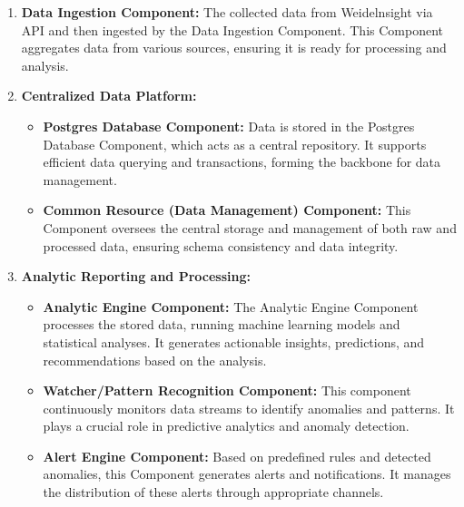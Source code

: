 \documentclass[11pt]{article}
\begin{document}
\begin{enumerate}[label=\arabic*., wide=0pt, left=0pt]

    \item \textbf{Data Ingestion Component:} The collected data from Weidelnsight via API and then ingested by the Data Ingestion Component. This Component aggregates data from various sources, ensuring it is ready for processing and analysis.

    \item \textbf{Centralized Data Platform:}
    \begin{itemize}
        \item \textbf{Postgres Database Component:} Data is stored in the Postgres Database Component, which acts as a central repository. It supports efficient data querying and transactions, forming the backbone for data management.
        \item \textbf{Common Resource (Data Management) Component:} This Component oversees the central storage and management of both raw and processed data, ensuring schema consistency and data integrity.
    \end{itemize}

    \item \textbf{Analytic Reporting and Processing:}
    \begin{itemize}
        \item \textbf{Analytic Engine Component:} The Analytic Engine Component processes the stored data, running machine learning models and statistical analyses. It generates actionable insights, predictions, and recommendations based on the analysis.
        \item \textbf{Watcher/Pattern Recognition Component:} This component continuously monitors data streams to identify anomalies and patterns. It plays a crucial role in predictive analytics and anomaly detection.
        \item \textbf{Alert Engine Component:} Based on predefined rules and detected anomalies, this Component generates alerts and notifications. It manages the distribution of these alerts through appropriate channels.
    \end{itemize}


\end{enumerate}
\end{document}
